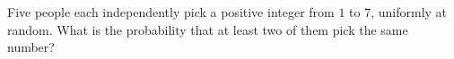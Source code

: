 Five people each independently pick a positive integer from $1$ to $7$, uniformly at random. What is the probability that at least two of them pick the same number?
